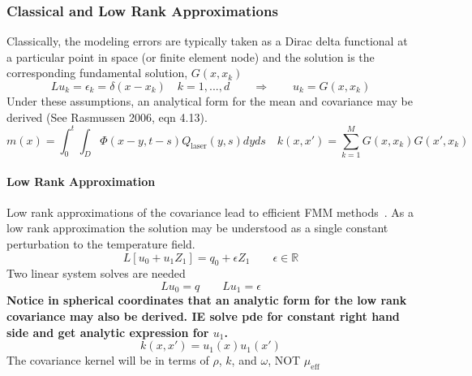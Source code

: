 \documentclass{article}         %
\theoremstyle{definition}
\theoremstyle{remark}
\begin{document}
\subsubsection{Classical and Low Rank Approximations}
Classically, the modeling errors are typically 
taken as a Dirac delta functional at a particular point in space (or
finite element node) and the solution is the corresponding fundamental
solution, $G(x,x_k)$
\[
L u_k = \epsilon_k  = \delta(x - x_k)
\quad k = 1, ..., d
\qquad
\Rightarrow
\qquad
u_k = G(x,x_k)
\]
Under these assumptions,
an analytical form for the mean and covariance may be derived
(See Rasmussen 2006, eqn 4.13).
\begin{equation} \label{PhysicsBasedCovarianceFunction}
m(x) = \int_0^t \int_D \Phi(x-y,t-s) Q_\text{laser}(y,s) dy ds
\quad
k(x,x') = \sum_{k=1}^M  G(x,x_k) G(x',x_k)
\end{equation}
\paragraph{Low Rank Approximation} 
Low rank approximations of the covariance lead to efficient FMM methods~\cite{fong2009black}.
As a low rank approximation
the solution may be understood as a single constant perturbation to the temperature
field.
\[
L \left[u_0 + u_1 Z_1\right]
= 
q_0 +  \epsilon Z_1
\qquad 
\epsilon \in \mathbb{R}
\]
Two linear system solves are needed
\[
L u_0 = q 
\qquad
L u_1 = \epsilon 
\]
\textbf{Notice in spherical coordinates that an analytic form for the low
rank covariance may also be derived. IE solve pde for constant right hand
side and get analytic expression for $u_1$.}
\[
k(x,x') = u_1(x) u_1(x')
\]
The covariance kernel will be in terms of $\rho$, $k$, and $\omega$, NOT
$\mu_\text{eff}$
\end{document}
